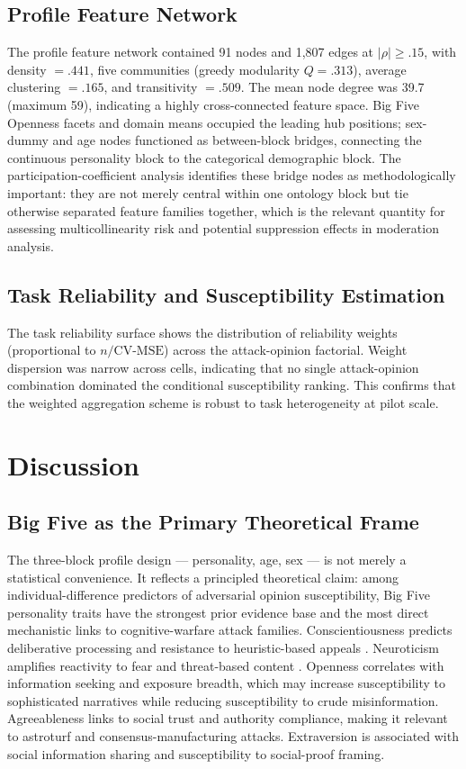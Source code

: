 \documentclass[11pt,a4paper]{article}
\begin{document}
\subsection{Profile Feature Network}

The profile feature network contained 91 nodes and 1{,}807 edges at $|\rho| \ge .15$, with density $= .441$, five communities (greedy modularity $Q = .313$), average clustering $= .165$, and transitivity $= .509$. The mean node degree was 39.7 (maximum 59), indicating a highly cross-connected feature space. Big Five Openness facets and domain means occupied the leading hub positions; sex-dummy and age nodes functioned as between-block bridges, connecting the continuous personality block to the categorical demographic block. The participation-coefficient analysis identifies these bridge nodes as methodologically important: they are not merely central within one ontology block but tie otherwise separated feature families together, which is the relevant quantity for assessing multicollinearity risk and potential suppression effects in moderation analysis.

\subsection{Task Reliability and Susceptibility Estimation}

The task reliability surface shows the distribution of reliability weights (proportional to $n/\mathrm{CV\text{-}MSE}$) across the attack-opinion factorial. Weight dispersion was narrow across cells, indicating that no single attack-opinion combination dominated the conditional susceptibility ranking. This confirms that the weighted aggregation scheme is robust to task heterogeneity at pilot scale.

\section{Discussion}

\subsection{Big Five as the Primary Theoretical Frame}

The three-block profile design --- personality, age, sex --- is not merely a statistical convenience. It reflects a principled theoretical claim: among individual-difference predictors of adversarial opinion susceptibility, Big Five personality traits have the strongest prior evidence base and the most direct mechanistic links to cognitive-warfare attack families. Conscientiousness predicts deliberative processing and resistance to heuristic-based appeals \citep{pennycook2019lazy}. Neuroticism amplifies reactivity to fear and threat-based content \citep{lewandowsky2017posttruth}. Openness correlates with information seeking and exposure breadth, which may increase susceptibility to sophisticated narratives while reducing susceptibility to crude misinformation. Agreeableness links to social trust and authority compliance, making it relevant to astroturf and consensus-manufacturing attacks. Extraversion is associated with social information sharing and susceptibility to social-proof framing.
\end{document}
